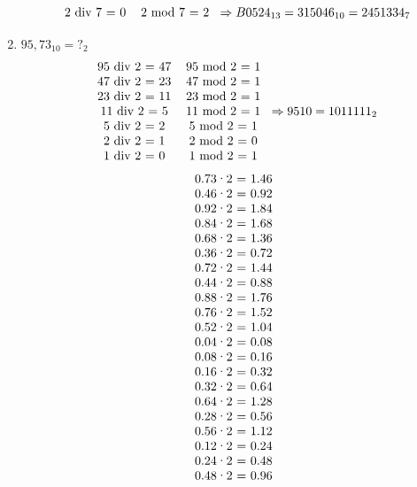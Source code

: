 \documentclass{article}
\begin{document}
\begin{enumerate}
$$\begin{tabular}{cc}
            2 div 7 = 0          & 2 mod 7 = 2      \\
          \end{tabular}
          \Rightarrow
          B0524_{13} = 315046_{10} = 2451334_{7}
        $$
  \item $ 95,73_{10}       = ?_{2}$
        $$   \begin{tabular}{cc}
            95 div 2 = 47 & 95 mod 2 = 1 \\
            47 div 2 = 23 & 47 mod 2 = 1 \\
            23 div 2 = 11 & 23 mod 2 = 1 \\
            11 div 2 = 5  & 11 mod 2 = 1 \\
            5 div 2 = 2   & 5 mod 2 = 1  \\
            2 div 2 = 1   & 2 mod 2 = 0  \\
            1 div 2 = 0   & 1 mod 2 = 1  \\
          \end{tabular}
          \Rightarrow
          95{10} = 1011111_{2}
        $$
        $$
          \begin{tabular}{c}
            0.73·2 = 1.46 \\
            0.46·2 = 0.92 \\
            0.92·2 = 1.84 \\
            0.84·2 = 1.68 \\
            0.68·2 = 1.36 \\
            0.36·2 = 0.72 \\
            0.72·2 = 1.44 \\
            0.44·2 = 0.88 \\
            0.88·2 = 1.76 \\
            0.76·2 = 1.52 \\
            0.52·2 = 1.04 \\
            0.04·2 = 0.08 \\
            0.08·2 = 0.16 \\
            0.16·2 = 0.32 \\
            0.32·2 = 0.64 \\
            0.64·2 = 1.28 \\
            0.28·2 = 0.56 \\
            0.56·2 = 1.12 \\
            0.12·2 = 0.24 \\
            0.24·2 = 0.48 \\
            0.48·2 = 0.96 \\

\end{tabular}$$
\end{enumerate}
\end{document}
